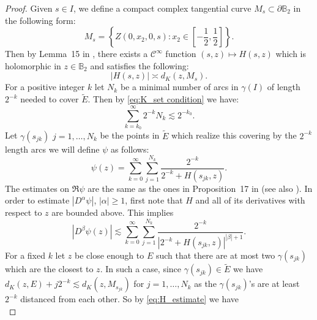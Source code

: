 \documentclass[a4paper,12pt]{amsart}
\theoremstyle{definition}
\theoremstyle{remark}
\def\B{\mathbb{B}}
\begin{document}
    \begin{proof}
        Given $s \in I$, we define a compact complex tangential curve $M_s \subset \partial \B_2$ in the following form:
        \begin{equation*}
            M_s = \left\{ Z(0,x_2,0,s): x_2 \in [-\frac{1}{2},\frac{1}{2}] \right\}.
        \end{equation*}
        Then by Lemma~{15} in \cite{Chaumat_Chollet_Hausdorff}, there exists a $\mathcal{C}^\infty$ function $(s,z) \mapsto H(s,z)$ which is holomorphic in $z \in \B_2$ and satisfies the following:
        \begin{equation} \label{eq:H_estimate}
            |H(s,z)| \asymp d_K(z,M_s).
        \end{equation}
        For a positive integer $k$ let $N_k$ be a minimal number of arcs in $\gamma(I)$ of length $2^{-k}$ needed to cover $\tilde{E}$. Then by \eqref{eq:K_set condition} we have:
        \begin{equation} \label{eq:N_k sum}
            \sum_{k = k_0}^{\infty} 2^{-k} N_k \lesssim 2^{-k_0}.
        \end{equation}
        Let $\gamma(s_{jk})$ $j = 1,\ldots,N_k$ be the points in $\tilde{E}$ which realize this covering by the $2^{-k}$ length arcs we will define $\psi$ as follows:
        \begin{equation}
            \psi(z) = \sum_{k = 0}^\infty \sum_{j = 1}^{N_k} \frac{2^{-k}}{2^{-k}+ H(s_{jk},z)}.
        \end{equation}
        The estimates on $\Re \psi$ are the same as the ones in Proposition~{17} in \cite{Chaumat_Chollet_Hausdorff} (see also \cite{Chaumat_Chollet_Division_Prop}). In order to estimate $|D^{\alpha} \psi|$, $|\alpha| \geq 1$, first note that $H$ and all of its derivatives with respect to $z$ are bounded above. This implies
        \begin{equation*}
            |D^{\beta} \psi(z)| \lesssim  \sum_{k = 0}^\infty \sum_{j = 1}^{N_k} \frac{2^{-k}}{\left|2^{-k}+ H(s_{jk},z) \right|^{|\beta|+1}}. 
        \end{equation*}
        For a fixed $k$ let $z$ be close enough to $E$ such that there are at most two $\gamma(s_{jk})$ which are the closest to $z$. In such a case, since $\gamma(s_{jk}) \in \tilde{E}$ we have $d_K(z,E) + j 2^{-k} \lesssim d_K(z,M_{s_{jk}})$ for $j = 1,\ldots, N_k$ as the $\gamma(s_{jk})$'s are at least $2^{-k}$ distanced from each other. So by \eqref{eq:H_estimate} we have
        \begin{equation*}

\end{equation*}
\end{proof}
\end{document}
